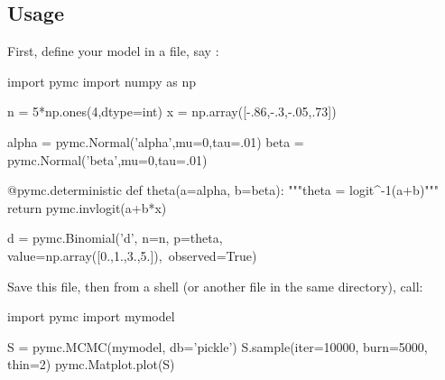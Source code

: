 \documentclass[]{jss}
\begin{document}
% 
% 
% 
% 
% 
% 
% 
% 
% 

\subsection{Usage}
  \label{usage}

First, define your model in a file, say :
%
\begin{CodeInput}
import pymc
import numpy as np

n = 5*np.ones(4,dtype=int)
x = np.array([-.86,-.3,-.05,.73])

alpha = pymc.Normal('alpha',mu=0,tau=.01)
beta = pymc.Normal('beta',mu=0,tau=.01)

@pymc.deterministic
def theta(a=alpha, b=beta):
    """theta = logit^{-1}(a+b)"""
    return pymc.invlogit(a+b*x)

d = pymc.Binomial('d', n=n, p=theta, value=np.array([0.,1.,3.,5.]),\
                  observed=True)
    
\end{CodeInput}


Save this file, then from a  shell (or another file in the same directory), call:
\begin{CodeInput}
import pymc
import mymodel
 
S = pymc.MCMC(mymodel, db='pickle')
S.sample(iter=10000, burn=5000, thin=2)
pymc.Matplot.plot(S)    
\end{CodeInput}
\end{document}
